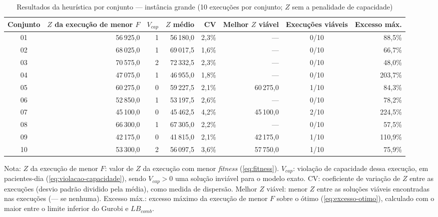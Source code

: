 \begin{table}[htbp]
    \caption{Resultados da heurística por conjunto --- instância grande (10 execuções por conjunto; $Z$ sem a penalidade de capacidade)}
    \label{tab:res-z-grande}
    \centering
    \begin{adjustbox}{max width=\textwidth}
    \begin{tabular}{crrrrrcr}
        \hline
        \textbf{Conjunto} & \textbf{$Z$ da execução de menor $F$} & \textbf{$V_{cap}$} & \textbf{$Z$ médio} & \textbf{CV} & \textbf{Melhor $Z$ viável} & \textbf{Execuções viáveis} & \textbf{Excesso máx.} \\
        \hline
        01 & 56\,925,0 & 1 & 56\,180,0 & 2,3\% & --- & 0/10 & 88,5\% \\
        02 & 68\,025,0 & 1 & 69\,017,5 & 1,6\% & --- & 0/10 & 66,7\% \\
        03 & 70\,575,0 & 2 & 72\,332,5 & 2,3\% & --- & 0/10 & 48,0\% \\
        04 & 47\,075,0 & 1 & 46\,955,0 & 1,8\% & --- & 0/10 & 203,7\% \\
        05 & 60\,275,0 & 0 & 59\,227,5 & 2,1\% & 60\,275,0 & 1/10 & 84,3\% \\
        06 & 52\,850,0 & 1 & 53\,197,5 & 2,6\% & --- & 0/10 & 78,2\% \\
        07 & 45\,100,0 & 0 & 45\,462,5 & 4,2\% & 45\,100,0 & 2/10 & 224,5\% \\
        08 & 66\,300,0 & 1 & 67\,305,0 & 2,2\% & --- & 0/10 & 57,5\% \\
        09 & 42\,175,0 & 0 & 41\,815,0 & 2,1\% & 42\,175,0 & 1/10 & 110,9\% \\
        10 & 53\,300,0 & 2 & 56\,097,5 & 3,6\% & 57\,750,0 & 1/10 & 75,9\% \\
        \hline
    \end{tabular}
    \end{adjustbox}
    \par\smallskip
    {\footnotesize Nota: $Z$ da execução de menor $F$: valor de $Z$ da execução com menor \textit{fitness} (\autoref{eq:fitness}). $V_{cap}$: violação de capacidade dessa execução, em pacientes-dia (\autoref{eq:violacao-capacidade}), sendo $V_{cap} > 0$ uma solução inviável para o modelo exato. CV: coeficiente de variação de $Z$ entre as execuções (desvio padrão dividido pela média), como medida de dispersão. Melhor $Z$ viável: menor $Z$ entre as soluções viáveis encontradas nas execuções (--- se nenhuma). Excesso máx.: excesso máximo da execução de menor $F$ sobre o ótimo (\autoref{eq:excesso-otimo}), calculado com o maior entre o limite inferior do Gurobi e $LB_{comb}$.}
\end{table}
